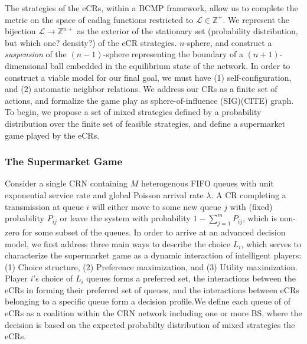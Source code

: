 \documentclass[10pt]{article}
\newcommand{\mcL}{\mathcal{L}}
\theoremstyle{definition}
\begin{document}
The strategies of the eCRs, within a BCMP framework, allow us to complete the
metric on the space of cadlag functions restricted to $\mcL \in \mathbb{Z}^+$.
We represent the bijection $\mcL \rightarrow \mathbb{Z}^{n+}$ as the exterior of
the stationary set (probability distribution, but which one? density?) of the eCR strategies.
$n$-sphere, and construct a \emph{suspension} of the $(n-1)$-sphere representing
the boundary of a $(n+1)$-dimensional ball embedded in the equilibrium state of
the network. 
In order to construct a viable model for our 
final goal, we must have (1) self-configuration, and (2) automatic neighbor relations. 
We address our CRs as a finite set of
actions, and formalize the game play as sphere-of-influence (SIG)(CITE) graph.
To begin, we propose a set of mixed
strategies defined by a probability distribution over
the finite set of feasible strategies, and define a 
supermarket game played by the eCRs.

\subsubsection{The Supermarket Game}

Consider a single CRN containing $M$ heterogenous FIFO queues with unit exponential service rate and global
Poisson arrival rate $\lambda$. A CR completing a transmission at queue $i$ will either 
move to some new queue $j$ with (fixed) probability $P_{ij}$ or leave the system 
with probability $\displaystyle 1-\sum _{j=1}^{m}P_{ij}$, which is non-zero for some subset of the queues. 
In order to arrive at an advanced decision model, we first address three main ways to describe the choice $L_i$, which serves to characterize the
supermarket game as a dynamic interaction of intelligent players: (1) Choice structure,
(2) Preference maximization, and (3) Utility maximization.
Player $i$'s choice of $L_i$ queues forms a preferred set, the interactions between the eCRs in forming their
preferred set of queues, and the interactions between eCRs belonging to a specific
queue form a decision profile.We define each queue of of eCRs as a coalition within the CRN network including one or more
BS, where the decision is based on the expected probabilty distribution of
mixed strategies the eCRs.
\end{document}
